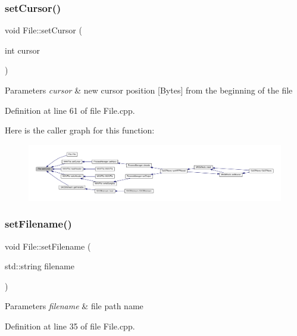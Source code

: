 \subsubsection{\texorpdfstring{set\+Cursor()}{setCursor()}}
{\footnotesize\ttfamily void File\+::set\+Cursor (\begin{DoxyParamCaption}\item[{int}]{cursor }\end{DoxyParamCaption})}


\begin{DoxyParams}{Parameters}
{\em cursor} & new cursor position \mbox{[}Bytes\mbox{]} from the beginning of the file \\
\hline
\end{DoxyParams}


Definition at line 61 of file File.\+cpp.

Here is the caller graph for this function\+:
\nopagebreak
\begin{figure}[H]
\begin{center}
\leavevmode
\includegraphics[width=350pt]{class_file_a3320ff9a60903cdae6eb7f3fff06b05c_icgraph}
\end{center}
\end{figure}
\mbox{\label{class_file_a4fc5c5228613d30b136e5e9a0a046339}} 
\subsubsection{\texorpdfstring{set\+Filename()}{setFilename()}}
{\footnotesize\ttfamily void File\+::set\+Filename (\begin{DoxyParamCaption}\item[{std\+::string}]{filename }\end{DoxyParamCaption})}


\begin{DoxyParams}{Parameters}
{\em filename} & file path name \\
\hline
\end{DoxyParams}


Definition at line 35 of file File.\+cpp.

